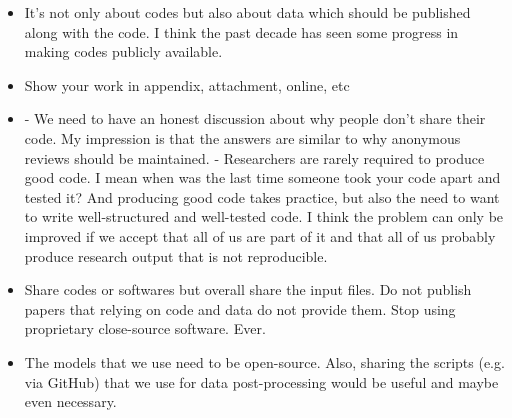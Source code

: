 \documentclass{article}
\begin{document}
\begin{itemize}
	\item It's not only about codes but also about data which should be published along with the code. I think the past decade has seen some progress in making codes publicly available.
	\item Show your work in appendix, attachment, online, etc
	\item - We need to have an honest discussion about why people don't share their code. My impression is that the answers are similar to why anonymous reviews should be maintained.  
- Researchers are rarely required to produce good code. I mean when was the last time someone took your code apart and tested it? And producing good code takes practice, but also the need to want to write well-structured and well-tested code. I think the problem can only be improved if we accept that all of us are part of it and that all of us probably produce research output that is not reproducible.
	\item Share codes or softwares but overall share the input files. Do not publish papers that relying on code and data do not provide them. Stop using proprietary close-source software. Ever.
	\item The models that we use need to be open-source. Also, sharing the scripts (e.g. via GitHub) that we use for data post-processing would be useful and maybe even necessary.
\end{itemize}
\end{document}
